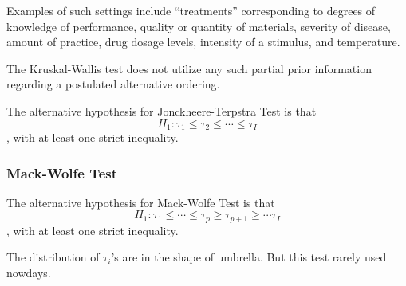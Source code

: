 Examples of such settings include ``treatments'' corresponding to
degrees of knowledge of performance, quality or quantity of
materials, severity of disease, amount of practice, drug dosage
levels, intensity of a stimulus, and temperature.

The Kruskal-Wallis test does not utilize any such partial prior
information regarding a postulated alternative ordering.

The alternative hypothesis for Jonckheere-Terpstra Test is that
\[H_1: \tau_1 \le \tau_2 \le \cdots \le \tau_I\]
, with at least one strict inequality.

\subsubsection{Mack-Wolfe Test}
The alternative hypothesis for Mack-Wolfe Test is that
\[H_1: \tau_1 \le \cdots \le \tau_p \ge \tau_{p+1} \ge \cdots \tau_I\]
, with at least one strict inequality.

The distribution of $\tau_i$'s are in the shape of umbrella. But this test rarely used nowdays.